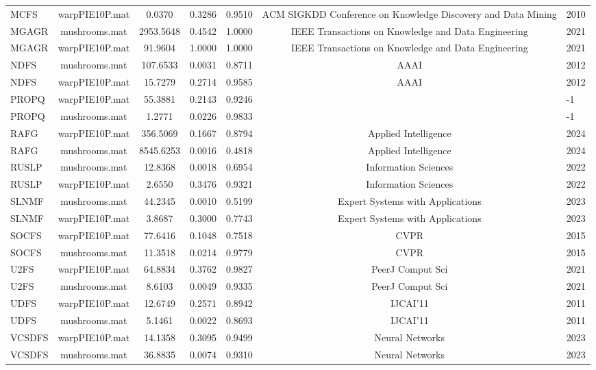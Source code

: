 \begin{table}
\begin{tabular}{lccccc}
MCFS & warpPIE10P.mat & 0.0370 & 0.3286 & 0.9510 & ACM SIGKDD Conference on Knowledge Discovery and Data Mining & 2010 \\
MGAGR & mushrooms.mat & 2953.5648 & 0.4542 & 1.0000 & IEEE Transactions on Knowledge and Data Engineering & 2021 \\
MGAGR & warpPIE10P.mat & 91.9604 & 1.0000 & 1.0000 & IEEE Transactions on Knowledge and Data Engineering & 2021 \\
NDFS & mushrooms.mat & 107.6533 & 0.0031 & 0.8711 & AAAI & 2012 \\
NDFS & warpPIE10P.mat & 15.7279 & 0.2714 & 0.9585 & AAAI & 2012 \\
PROPQ & warpPIE10P.mat & 55.3881 & 0.2143 & 0.9246 &  & -1 \\
PROPQ & mushrooms.mat & 1.2771 & 0.0226 & 0.9833 &  & -1 \\
RAFG & warpPIE10P.mat & 356.5069 & 0.1667 & 0.8794 & Applied Intelligence & 2024 \\
RAFG & mushrooms.mat & 8545.6253 & 0.0016 & 0.4818 & Applied Intelligence & 2024 \\
RUSLP & mushrooms.mat & 12.8368 & 0.0018 & 0.6954 & Information Sciences & 2022 \\
RUSLP & warpPIE10P.mat & 2.6550 & 0.3476 & 0.9321 & Information Sciences & 2022 \\
SLNMF & mushrooms.mat & 44.2345 & 0.0010 & 0.5199 & Expert Systems with Applications & 2023 \\
SLNMF & warpPIE10P.mat & 3.8687 & 0.3000 & 0.7743 & Expert Systems with Applications & 2023 \\
SOCFS & warpPIE10P.mat & 77.6416 & 0.1048 & 0.7518 & CVPR & 2015 \\
SOCFS & mushrooms.mat & 11.3518 & 0.0214 & 0.9779 & CVPR & 2015 \\
U2FS & warpPIE10P.mat & 64.8834 & 0.3762 & 0.9827 & PeerJ Comput Sci & 2021 \\
U2FS & mushrooms.mat & 8.6103 & 0.0049 & 0.9335 & PeerJ Comput Sci & 2021 \\
UDFS & warpPIE10P.mat & 12.6749 & 0.2571 & 0.8942 & IJCAI'11 & 2011 \\
UDFS & mushrooms.mat & 5.1461 & 0.0022 & 0.8693 & IJCAI'11 & 2011 \\
VCSDFS & warpPIE10P.mat & 14.1358 & 0.3095 & 0.9499 & Neural Networks & 2023 \\
VCSDFS & mushrooms.mat & 36.8835 & 0.0074 & 0.9310 & Neural Networks & 2023 \\
\bottomrule
\end{tabular}
\end{table}
